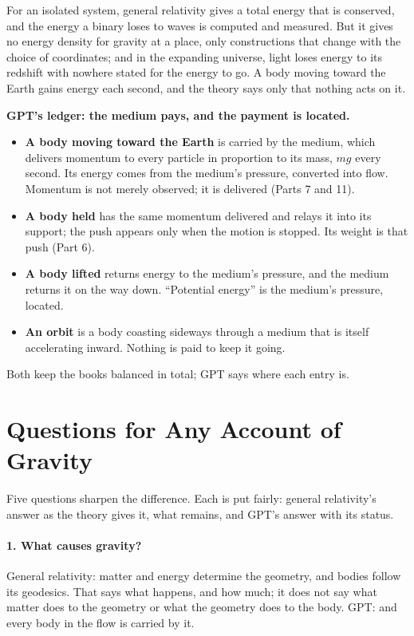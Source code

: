  For an isolated system, general relativity gives a total energy that is conserved, and the energy a binary loses to waves is computed and measured. But it gives no energy density for gravity at a place, only constructions that change with the choice of coordinates; and in the expanding universe, light loses energy to its redshift with nowhere stated for the energy to go. A body moving toward the Earth gains energy each second, and the theory says only that nothing acts on it.

\begin{hypbar}
\textbf{GPT's ledger: the medium pays, and the payment is located.}
\begin{itemize}
\item \textbf{A body moving toward the Earth} is carried by the medium, which delivers momentum to every particle in proportion to its mass, $mg$ every second. Its energy comes from the medium's pressure, converted into flow. Momentum is not merely observed; it is delivered (Parts 7 and 11).
\item \textbf{A body held} has the same momentum delivered and relays it into its support; the push appears only when the motion is stopped. Its weight is that push (Part 6).
\item \textbf{A body lifted} returns energy to the medium's pressure, and the medium returns it on the way down. ``Potential energy'' is the medium's pressure, located.
\item \textbf{An orbit} is a body coasting sideways through a medium that is itself accelerating inward. Nothing is paid to keep it going.
\end{itemize}
\end{hypbar}

 Both keep the books balanced in total; GPT says where each entry is.

\section{Questions for Any Account of Gravity}

Five questions sharpen the difference. Each is put fairly: general relativity's answer as the theory gives it, what remains, and GPT's answer with its status.

\paragraph{1. What causes gravity?} General relativity: matter and energy determine the geometry, and bodies follow its geodesics. That says what happens, and how much; it does not say what matter does to the geometry or what the geometry does to the body. GPT:  and every body in the flow is carried by it.

